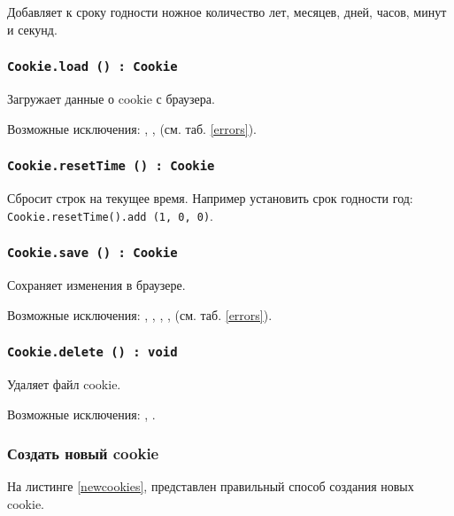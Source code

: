 Добавляет к сроку годности ножное количество лет, месяцев, дней, часов, минут и секунд.

\subsubsection{\texttt{Cookie.load () : Cookie}}

Загружает данные о cookie с браузера.

Возможные исключения: , ,  (см. таб. \ref{errors}).

\subsubsection{\texttt{Cookie.resetTime () : Cookie}}

Сбросит строк на текущее время. Например установить срок годности год: \texttt{Cookie.resetTime().add (1, 0, 0)}.

\subsubsection{\texttt{Cookie.save () : Cookie}}

Сохраняет изменения в браузере.

Возможные исключения: , , , ,  (см. таб. \ref{errors}).

\subsubsection{\texttt{Cookie.delete () : void}}

Удаляет файл cookie.

Возможные исключения: , .

\subsubsection{Создать новый cookie}

На листинге \ref{newcookies}, представлен правильный способ создания новых cookie.

\begin{sourcecode}
	\label{newcookies}
    \inputminted[linenos]{icl}{../sources/newcookies.icL}
\end{sourcecode}


